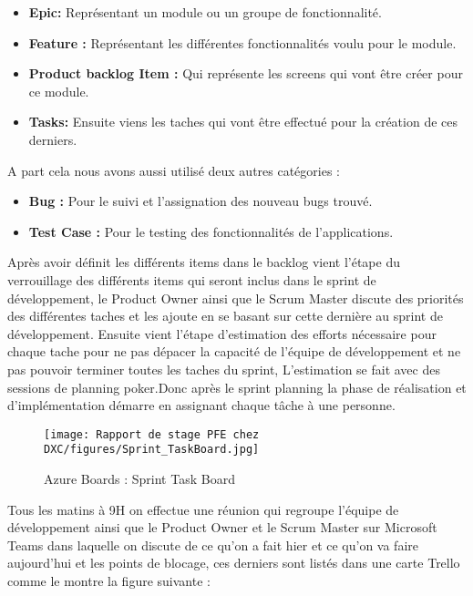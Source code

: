 \begin{itemize}

  \item \textbf{Epic:} Représentant un module ou un groupe de fonctionnalité.
  \item \textbf{Feature :} Représentant les différentes fonctionnalités voulu pour le module.
  \item \textbf{Product backlog Item :} Qui représente les screens qui vont être créer pour ce module.
  \item \textbf{Tasks:} Ensuite viens les taches qui vont être effectué pour la création de ces derniers.
\end{itemize}

\vspace{0.5cm}

A part cela nous avons aussi utilisé deux autres catégories :
\\

\begin{itemize}
  \item \textbf{Bug :} Pour le suivi et l’assignation des nouveau bugs trouvé.
  \item \textbf{Test Case :} Pour le testing des fonctionnalités de l’applications.
\end{itemize}

\vspace{\baselineskip}
Après avoir définit les différents items dans le backlog vient l'étape du verrouillage des différents items qui seront inclus dans le sprint de développement, le Product Owner ainsi que le Scrum Master discute des priorités des différentes taches et les ajoute en se basant sur cette dernière au sprint de développement.
Ensuite vient l'étape d'estimation des efforts nécessaire pour chaque tache pour ne pas dépacer la capacité de l'équipe de développement et ne pas pouvoir terminer toutes les taches du sprint, L'estimation se fait avec des sessions de planning poker.Donc après le sprint planning la phase de réalisation et d’implémentation démarre en assignant chaque tâche à une personne.


\begin{figure}[H]
    \centering
    \texttt{[image: Rapport de stage PFE chez DXC/figures/Sprint\_TaskBoard.jpg]}
    \caption{Azure Boards : Sprint Task Board}
\end{figure}

Tous les matins à 9H on effectue une réunion qui regroupe l'équipe de développement ainsi que le Product Owner et le Scrum Master sur Microsoft Teams dans laquelle on discute de ce qu’on a fait hier et ce qu’on va faire aujourd’hui et les points de blocage, ces derniers sont listés dans une carte Trello comme le montre la figure suivante :

